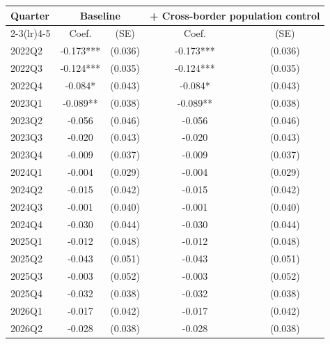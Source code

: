 \begin{tabular}{@{}lcccc@{}}
\toprule
Quarter & \multicolumn{2}{c}{Baseline} & \multicolumn{2}{c}{+ Cross-border population control} \\
\cmidrule(lr){2-3}\cmidrule(lr){4-5}
& Coef. & (SE) & Coef. & (SE) \\
\midrule
2022Q2 & -0.173*** & (0.036) & -0.173*** & (0.036) \\
2022Q3 & -0.124*** & (0.035) & -0.124*** & (0.035) \\
2022Q4 & -0.084* & (0.043) & -0.084* & (0.043) \\
2023Q1 & -0.089** & (0.038) & -0.089** & (0.038) \\
2023Q2 & -0.056 & (0.046) & -0.056 & (0.046) \\
2023Q3 & -0.020 & (0.043) & -0.020 & (0.043) \\
2023Q4 & -0.009 & (0.037) & -0.009 & (0.037) \\
2024Q1 & -0.004 & (0.029) & -0.004 & (0.029) \\
2024Q2 & -0.015 & (0.042) & -0.015 & (0.042) \\
2024Q3 & -0.001 & (0.040) & -0.001 & (0.040) \\
2024Q4 & -0.030 & (0.044) & -0.030 & (0.044) \\
2025Q1 & -0.012 & (0.048) & -0.012 & (0.048) \\
2025Q2 & -0.043 & (0.051) & -0.043 & (0.051) \\
2025Q3 & -0.003 & (0.052) & -0.003 & (0.052) \\
2025Q4 & -0.032 & (0.038) & -0.032 & (0.038) \\
2026Q1 & -0.017 & (0.042) & -0.017 & (0.042) \\
2026Q2 & -0.028 & (0.038) & -0.028 & (0.038) \\
\bottomrule
\end{tabular}
